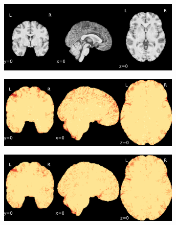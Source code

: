 \documentclass{article}
\begin{document}
\begin{landscape}
    \begin{figure}
        \vspace*{-2cm}
        \centering
        \begin{subfigure}[t]{0.2\paperheight}
            \centering
            \includegraphics[width=\textwidth]{figures/ieee_T1/ds001600_sub-1_ieee_mean.pdf}
        \end{subfigure}
        \begin{subfigure}[t]{0.2\paperheight}
            \centering
            \includegraphics[width=\textwidth]{figures/sig/ds001600_sub-1_rr_sig.pdf}
        \end{subfigure}
        \begin{subfigure}[t]{0.2\paperheight}
            \centering
            \includegraphics[width=\textwidth]{figures/sig/ds001600_sub-1_rs_sig.pdf}
        \end{subfigure}
        \begin{subfigure}[t]{0.2\paperheight}

\end{subfigure}
\end{figure}
\end{landscape}
\end{document}
